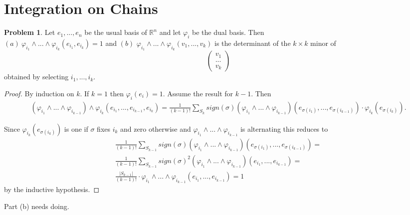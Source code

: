 \documentclass[20pt]{article}
\theoremstyle{plain}
\theoremstyle{definition}
\newtheorem*{problem}{Problem}
\begin{document}
\break
\section{Integration on Chains}



\begin{problem}{4.1}
  Let $e_1, ..., e_n$ be the usual basis of $\mathbb{R}^n$ and let $\varphi_i$ be the dual basis.
  Then \\
  $(a) \ \varphi_{i_1} \wedge ... \wedge \varphi_{i_k} (e_{i_1}, e_{i_k}) = 1$ and
  $(b)$ $\varphi_{i_1} \wedge ... \wedge \varphi_{i_k}(v_1, ..., v_k)$ is the determinant of
  the $k \times k$ minor of
  $$\begin{pmatrix}v_1 \\ ...\\ v_k\end{pmatrix}$$
  obtained by selecting $i_1, ..., i_k$.
\end{problem}

\begin{proof}
  By induction on $k$.
  If $k = 1$ then $\varphi_i(e_i) = 1.$
  Assume the result for $k-1$. Then
  \begin{align*}
    (\varphi_{i_{1}} \wedge ... \wedge \varphi_{i_{k-1}}) \wedge \varphi_{i_{k}}
    (e_{i_1}, ..., e_{i_{k-1}}, e_{i_{k}})=
    \frac{1}{(k-1)!} \sum_{S_k}sign(\sigma)(\varphi_{i_{1}} \wedge ... \wedge \varphi_{i_{k-1}})(e_{\sigma(i_1)}, ..., e_{\sigma(i_{k-1})}) \cdot
     \varphi_{i_{k}}(e_{\sigma(i_k)}).
  \end{align*}

  Since $\varphi_{i_{k}}(e_{\sigma(i_k)})$ is one if $\sigma$ fixes $i_k$ and zero otherwise and
  $\varphi_{i_{1}} \wedge ... \wedge \varphi_{i_{k-1}}$ is alternating this reduces to
  \begin{align*}
    \frac{1}{(k-1)!} \sum_{S_{k-1}}sign(\sigma)(\varphi_{i_{1}} \wedge ... \wedge \varphi_{i_{k-1}})(e_{\sigma(i_1)}, ..., e_{\sigma(i_{k-1})}) = \\
    \frac{1}{(k-1)!} \sum_{S_{k-1}}sign(\sigma)^2(\varphi_{i_{1}} \wedge ... \wedge \varphi_{i_{k-1}})(e_{i_1}, ..., e_{i_{k-1}}) = \\
    \frac{|S_{k-1}|}{(k-1)!} \cdot  \varphi_{i_{1}} \wedge ... \wedge \varphi_{i_{k-1}} (e_{i_1}, ..., e_{i_{k-1}}) = 1
  \end{align*}
  by the inductive hypothesis.
\end{proof}
\color{Blue}
Part (b) needs doing.
\color{Black}
\end{document}
